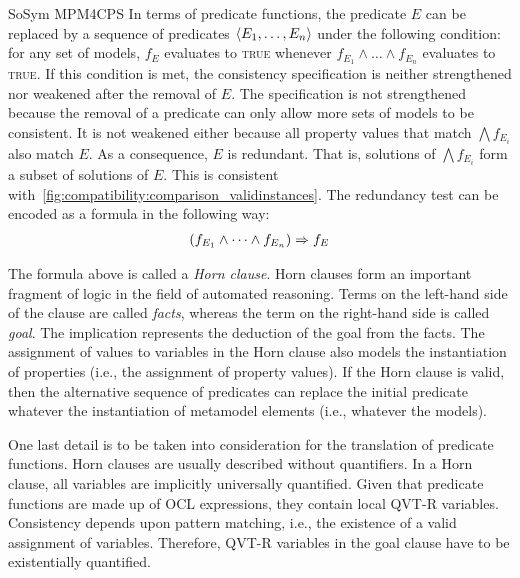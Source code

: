 \begin{copiedFrom}{SoSym MPM4CPS}
In terms of predicate functions, the predicate $E$ can be replaced by a sequence of predicates $\langle E_1, \dots, E_n \rangle$ under the following condition: for any set of models, $f_E$ evaluates to \textsc{true} whenever $f_{E_1} \wedge \dots \wedge f_{E_n}$ evaluates to \textsc{true}. If this condition is met, the consistency specification is neither strengthened nor weakened after the removal of $E$. The specification is not strengthened because the removal of a predicate can only allow more sets of models to be consistent. It is not weakened either because all property values that match $\bigwedge f_{E_i}$ also match $E$. As a consequence, $E$ is redundant. That is, solutions of $\bigwedge f_{E_i}$ form a subset of solutions of $E$. This is consistent with~\autoref{fig:compatibility:comparison_validinstances}. The redundancy test can be encoded as a formula in the following way:
\begin{align*}
    \hspace{1em} &
    (f_{E_1} \wedge \dots \wedge f_{E_n}) \Rightarrow f_{E}
\end{align*}

The formula above is called a \textit{Horn clause}. Horn clauses form an important fragment of logic in the field of automated reasoning. Terms on the left-hand side of the clause are called \textit{facts}, whereas the term on the right-hand side is called \textit{goal}. The implication represents the deduction of the goal from the facts. The assignment of values to variables in the Horn clause also models the instantiation of properties (i.e., the assignment of property values). If the Horn clause is valid, then the alternative sequence of predicates can replace the initial predicate whatever the instantiation of metamodel elements (i.e., whatever the models).

One last detail is to be taken into consideration for the translation of predicate functions. Horn clauses are usually described without quantifiers. In a Horn clause, all variables are implicitly universally quantified. Given that predicate functions are made up of OCL expressions, they contain local QVT-R variables. Consistency depends upon pattern matching, i.e., the existence of a valid assignment of variables. Therefore, QVT-R variables in the goal clause have to be existentially quantified.


\end{copiedFrom}
